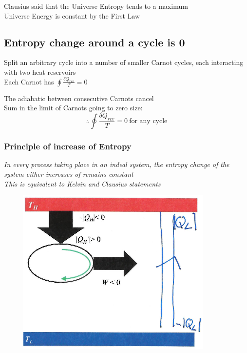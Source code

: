 \documentclass[a4paper, 11pt, normalem]{report}
\begin{document}
Clausius said that the Universe Entropy tends to a maximum \\
Universe Energy is constant by the First Law

\subsection{Entropy change around a cycle is 0}
Split an arbitrary cycle into a number of smaller Carnot cycles, each interacting with two heat reservoirs \\
Each Carnot has $\oint \frac{\delta Q_{rev}}{T} = 0$

The adiabatic between consecutive Carnots cancel \\
Sum in the limit of Carnots going to zero size:
\begin{equation*}
    \therefore \oint \frac{\delta Q_{rev}}{T} = 0 ~ \text{for any cycle}
\end{equation*}

\subsubsection{Principle of increase of Entropy}
\emph{In every process taking place in an indeal system, the entropy change of the system either increases of remains constant \\
This is equivalent to Kelvin and Clausius statements}

\begin{figure}
    \begin{center}
        \includegraphics[scale=0.5]{EquivEntropy.png}
    \end{center}
\end{figure}
\end{document}
